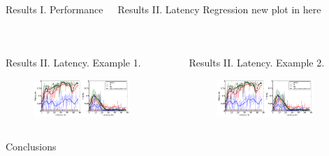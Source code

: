 \documentclass[final,t,overlay, xcolor=table, sans, mathserif]{beamer}
\begin{document}
\begin{frame}{}
\begin{columns}[t]
\begin{column}{.65\linewidth}
\begin{columns}
\begin{block}{Results I. Performance}
\begin{columns}
\begin{figure}
\end{figure}
\end{columns}
\end{block}
\begin{block}{Results II. Latency}
\centering
Regression new plot in here
\end{block}
\end{columns}

\begin{columns}
\begin{block}{Results II. Latency. Example 1.}
\begin{figure}
\includegraphics[width=0.85\textwidth]{figures/Patient_2_latency.pdf}
\end{figure}
\end{block}
\begin{block}{Results II. Latency. Example 2.}
\begin{figure}
\includegraphics[width=0.85\textwidth]{figures/Patient_2_latency.pdf}
\end{figure}
\end{block}
\end{columns}




\begin{block}{Conclusions}
\end{block}




\end{column}
\end{columns}


\end{frame}
\end{document}
